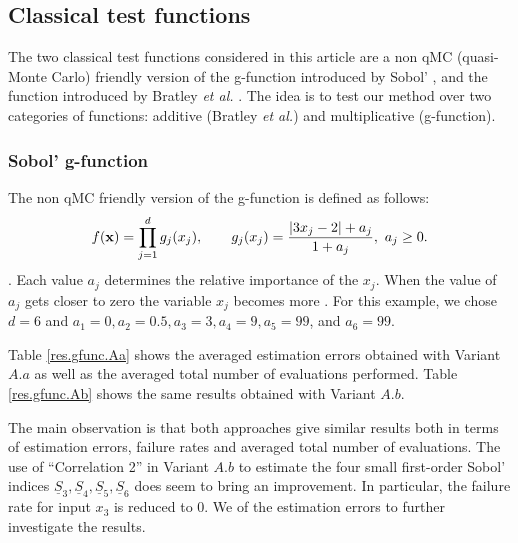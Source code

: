 \subsection{Classical test functions}
\label{sec:5.1}

The two classical test functions considered in this article are a non qMC (quasi-Monte Carlo) friendly version of the g-function introduced by Sobol' \cite{Sobol'}, and the function introduced by Bratley \textit{et al.} \cite{Bratley}. The idea is to test our method over two categories of functions: additive (Bratley \textit{et al.}) and multiplicative (g-function).

\subsubsection{Sobol' g-function}

The non qMC friendly version of the g-function is defined as follows:
\begin{equation*}
f(\boldsymbol{\mathbf{x}}) = \prod \limits_{j=1}^{d}g_j(x_j), \qquad g_j(x_j)=\frac{\left |3x_j-2 \right | + a_j}{1 + a_j}, \ a_j \geq 0.
\end{equation*}
. Each value $a_j$ determines the relative importance of the $x_j$. When the value of $a_j$ gets closer to zero the variable $x_j$ becomes more . For this example, we chose $d=6$ and $a_1=0,a_2=0.5, a_3=3, a_4=9, a_5=99$, and $a_6=99$.

Table \ref{res.gfunc.Aa} shows the averaged estimation errors obtained with Variant $A.a$ as well as the averaged total number of evaluations performed. Table \ref{res.gfunc.Ab} shows the same results obtained with Variant $A.b$.

The main observation is that both approaches give similar results both in terms of estimation errors, failure rates and averaged total number of evaluations. The use of ``Correlation 2'' in Variant $A.b$ to estimate the four small first-order Sobol' indices $\underline{S}_3, \underline{S}_4, \underline{S}_5, \underline{S}_6$ does seem to bring an improvement. In particular, the failure rate for input $x_3$ is reduced to $0$. We  of the estimation errors to further investigate the results. 
\bigskip

